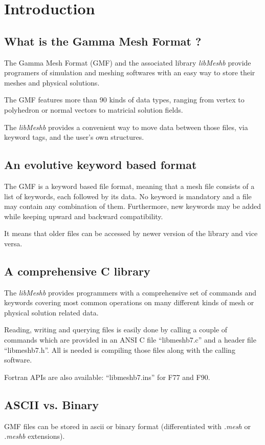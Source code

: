 \documentclass[a4paper,12pt]{article}
\begin{document}
%
%

\section{Introduction}

\subsection{What is the Gamma Mesh Format ?}
The Gamma Mesh Format (GMF) and the associated library \emph{libMeshb} provide programers of simulation and meshing softwares with an easy way to store their meshes and physical solutions.

The GMF features more than 90 kinds of data types, ranging from vertex to polyhedron or normal vectors to matricial solution fields.

The \emph{libMeshb} provides a convenient way to move data between those files, via keyword tags, and the user's own structures.


\subsection{An evolutive keyword based format}
The GMF is a keyword based file format, meaning that a mesh file consists of a list of keywords, each followed by its data. No keyword is mandatory and a file may contain any combination of them. Furthermore, new keywords may be added while keeping upward and backward compatibility.

It means that older files can be accessed by newer version of the library and vice versa.


\subsection{A comprehensive C library}
The \emph{libMeshb} provides programmers with a comprehensive set of commands and keywords covering most common operations on many different kinds of mesh or physical solution related data.

Reading, writing and querying files is easily done by calling a couple of commands which are provided in an ANSI C file ``libmeshb7.c'' and a header file ``libmeshb7.h''. All is needed is compiling those files along with the calling software.

Fortran APIs are also available: ``libmeshb7.ins'' for F77 and F90.


\subsection{ASCII vs. Binary}
GMF files can be stored in ascii or binary format (differentiated with \emph{.mesh} or \emph{.meshb} extensions).
\end{document}
